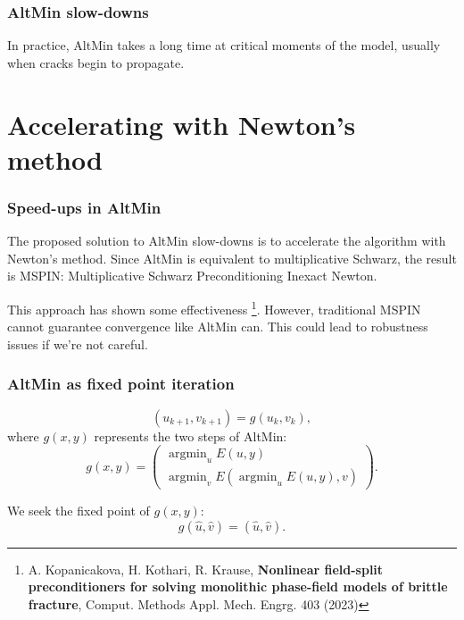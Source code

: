 \documentclass{beamer}
\DeclareMathOperator{\argmin}{argmin}
\begin{document}
\begin{frame}
\frametitle{AltMin slow-downs}

In practice, AltMin takes a long time at critical moments of the model, usually when cracks begin to propagate.


\end{frame}

\section{Accelerating with Newton's method}

\begin{frame}
\frametitle{Speed-ups in AltMin}

The proposed solution to AltMin slow-downs is to accelerate the algorithm with Newton's method.
Since AltMin is equivalent to multiplicative Schwarz, the result is MSPIN: Multiplicative Schwarz Preconditioning Inexact Newton.

This approach has shown some effectiveness \footnote{A. Kopanicakova, H. Kothari, R. Krause, \textbf{Nonlinear field-split preconditioners for solving monolithic phase-field models of brittle fracture}, Comput. Methods Appl. Mech. Engrg. 403 (2023)}.
However, traditional MSPIN cannot guarantee convergence like AltMin can.
This could lead to robustness issues if we're not careful.
\end{frame}

\begin{frame}
\frametitle{AltMin as fixed point iteration}

\begin{equation*}
	(u_{k+1}, v_{k+1}) = g(u_k,v_k),
\end{equation*}
where $g(x,y)$ represents the two steps of AltMin:
\begin{equation*}
	g(x,y) = \begin{pmatrix} \argmin_u E(u, y) \\ \argmin_v E(\argmin_u E(u,y), v) \end{pmatrix}.
\end{equation*}

We seek the fixed point of $g(x,y)$:
\begin{equation*}
	g(\hat{u}, \hat{v}) = (\hat{u}, \hat{v}).
\end{equation*}

\end{frame}
\end{document}

